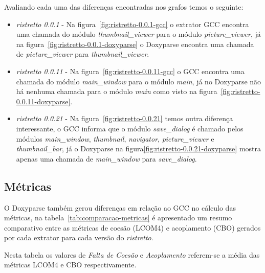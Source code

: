Avaliando cada uma das diferenças encontradas nos grafos temos o seguinte:

\begin{itemize}

\item {\it ristretto 0.0.1} - Na figura~\ref{fig:ristretto-0.0.1-gcc} o
extrator GCC encontra uma chamada do módulo {\it thumbnail\_viewer} para o módulo {\it
picture\_viewer}, já na figura~\ref{fig:ristretto-0.0.1-doxyparse} o Doxyparse
encontra uma chamada de {\it picture\_viewer} para {\it thumbnail\_viewer}.

\item {\it ristretto 0.0.11} - Na figura~\ref{fig:ristretto-0.0.11-gcc} o GCC
encontra uma chamada do módulo {\it main\_window} para o módulo {\it main}, já
no Doxyparse não há nenhuma chamada para o módulo {\it main} como visto na
figura~\ref{fig:ristretto-0.0.11-doxyparse}. 

\item {\it ristretto 0.0.21} - Na figura~\ref{fig:ristretto-0.0.21} temos outra
diferença interessante, o GCC informa que o módulo {\it save\_dialog} é chamado
pelos módulos {\it main\_window}, {\it thumbnail}, {\it navigator}, {\it
picture\_viewer} e {\it thumbnail\_bar}, já o Doxyparse na
figura\ref{fig:ristretto-0.0.21-doxyparse} mostra apenas uma chamada de {\it
main\_window} para {\it save\_dialog}.

\end{itemize}

\subsection{Métricas}

O Doxyparse também gerou diferenças em relação ao GCC no cálculo das métricas,
na tabela~\ref{tab:comparacao-metricas} é apresentado um resumo comparativo
entre as métricas de coesão (LCOM4) e acoplamento (CBO) gerados por cada
extrator para cada versão do {\it ristretto}.

Nesta tabela os valores de {\it Falta de Coesão} e {\it Acoplamento} referem-se
a média das métricas LCOM4 e CBO respectivamente.

